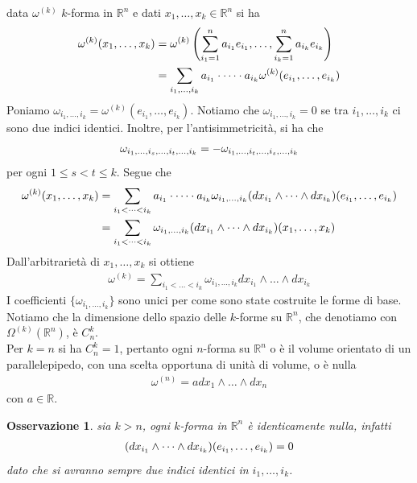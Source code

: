 \documentclass[twoside, 11pt]{amsbook}
\makeatletter
\newcommand{\0}{{(0)}}
\newcommand{\3}{{(3)}}
\theoremstyle{colonplain}
\theoremstyle{colondefinition}
\theoremstyle{colonremark}
\newtheorem{rmk}[thm]{Osservazione}
\numberwithin{equation}{chapter}
\renewcommand{\proofname}{Dimostrazione}
\renewenvironment{proof}[1][\proofname]{\par
  \pushQED{\qed}%
  \normalfont \topsep6\p@\@plus6\p@\relax
  \trivlist
  \item[\hskip\labelsep\bfseries #1:]\ignorespaces
}{%
  \popQED\endtrivlist\@endpefalse
}
\makeatother
\begin{document}
\begin{proof} data $\omega^{(k)}$ $k$-forma in $\mathbb{R}^n$ e dati $x_1, \dots, x_k \in \mathbb{R}^n$ si ha
\begin{align}
    \omega^{(k)}(x_1, \dots, x_k) &= \omega^{(k)}\left(\sum_{i_1 = 1}^n a_{i_1}e_{i_1}, \dots, \sum_{i_k = 1}^n a_{i_k}e_{i_k}\right) \notag \\
    &= \sum_{i_1, \dots, i_k} a_{i_1} \cdot \dots \cdot a_{i_k}\omega^{(k)}(e_{i_1}, \dots, e_{i_k}) \notag
\end{align}
Poniamo $\omega_{i_1, \dots, i_k} = \omega^{(k)}(e_{i_1}, \dots, e_{i_k})$. Notiamo che $\omega_{i_1, \dots, i_k} = 0$ se tra $i_1, \dots, i_k$ ci sono due indici identici. Inoltre, per l'antisimmetricità, si ha che \begin{align}
    \omega_{i_1, \dots, i_s, \dots, i_t, \dots, i_k} = -\omega_{i_1, \dots, i_t, \dots, i_s, \dots, i_k} \notag
\end{align}
per ogni $1 \leq s < t \leq k$. Segue che 
\begin{align}
    \omega^{(k)}(x_1, \dots, x_k) &= \sum_{i_1 < \dots < i_k}a_{i_1} \cdot \dots \cdot a_{i_k}\omega_{i_1, \dots, i_k}(dx_{i_1} \wedge \dots \wedge dx_{i_k})(e_{i_1}, \dots, e_{i_k}) \notag \\
    &= \sum_{i_1 < \dots < i_k} \omega_{i_1, \dots, i_k}(dx_{i_1} \wedge \dots \wedge dx_{i_k})(x_1, \dots, x_k) 
\end{align}
Dall'arbitrarietà di $x_1, \dots, x_k$ si ottiene 
\begin{align}
    \omega^{(k)} = \sum_{i_1 < \dots < i_k} \omega_{i_1, \dots, i_k}dx_{i_1} \wedge \dots \wedge dx_{i_k} 
\end{align}
I coefficienti $\{\omega_{i_1, \dots, i_k}\}$ sono unici per come sono state costruite le forme di base.
\end{proof}
Notiamo che la dimensione dello spazio delle $k$-forme su $\mathbb{R}^n$, che denotiamo con $\Omega^{(k)}(\mathbb{R}^n)$, è $C^k_n$. \\
Per $k = n$ si ha $C^k_n = 1$, pertanto ogni $n$-forma su $\mathbb{R}^n$ o è il volume orientato di un parallelepipedo, con una scelta opportuna di unità di volume, o è nulla
\begin{align}
    \omega^{(n)} = adx_1 \wedge \dots \wedge dx_n 
\end{align}
con $a \in \mathbb{R}$.
\begin{rmk} sia $k > n$, ogni $k$-forma in $\mathbb{R}^n$ è identicamente nulla, infatti 
\begin{align}
    (dx_{i_1} \wedge \dots \wedge dx_{i_k})(e_{i_1}, \dots, e_{i_k}) = 0 \notag
\end{align}
dato che si avranno sempre due indici identici in $i_1, \dots, i_k$.
\end{rmk}
\end{document}

